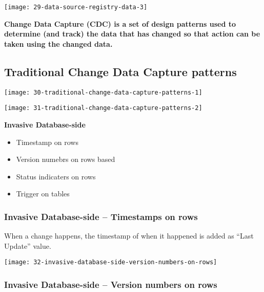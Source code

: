 \hrulefill

\begin{center}
\texttt{[image: 29-data-source-registry-data-3]}
\end{center}

\begin{center}
\textbf{Change Data Capture (CDC) is a set of design patterns used to determine (and track) the data that has changed so that action can be taken using the changed data.}
\end{center}

\subsection{Traditional Change Data Capture patterns}

\begin{center}
\texttt{[image: 30-traditional-change-data-capture-patterns-1]}
\end{center}

\begin{center}
\texttt{[image: 31-traditional-change-data-capture-patterns-2]}
\end{center}

\textbf{Invasive Database-side}
\begin{itemize}
	\item Timestamp on rows
	\item Version numebrs on rows based
	\item Status indicaters on rows
	\item Trigger on tables
\end{itemize}

\subsubsection{Invasive Database-side – Timestamps on rows}

When a change happens, the timestamp of when it happened is added as “Last Update” value.

\begin{center}
\texttt{[image: 32-invasive-database-side-version-numbers-on-rows]}
\end{center}

\subsubsection{Invasive Database-side – Version numbers on rows}

